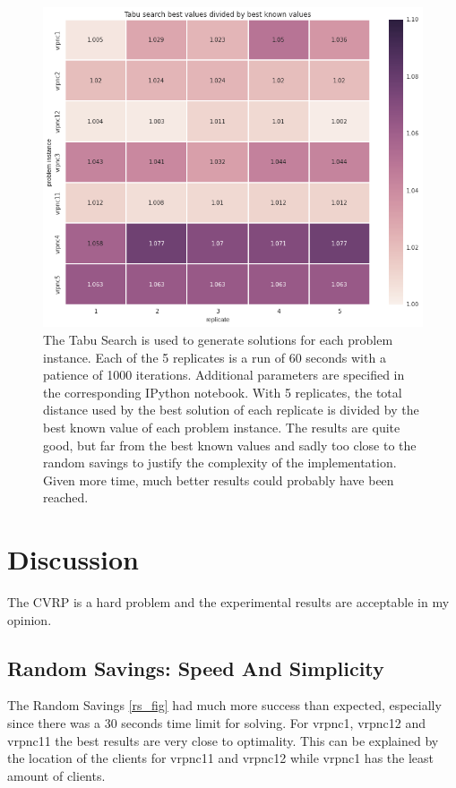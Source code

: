 \documentclass{article} %
\begin{document}
\begin{figure}[!htb]
\begin{center}
 \includegraphics[scale=0.45]{figures/tabu_search}
 \caption{\small  The Tabu Search is used to generate solutions for each problem instance. Each of the 5 replicates is a run of 60 seconds with a patience of 1000 iterations. Additional parameters are specified in the corresponding IPython notebook. With 5 replicates, the total distance used by the best solution of each replicate is divided by the best known value of each problem instance. The results are quite good, but far from the best known values and sadly too close to the random savings to justify the complexity of the implementation. Given more time, much better results could probably have been reached.}
 \label{ts_fig}
 \end{center}
\end{figure}


\newpage
\section{Discussion}
\label{analysis_results}

The CVRP is a hard problem and the experimental results are acceptable in my opinion.\newline

\subsection{Random Savings: Speed And Simplicity}
The Random Savings \ref{rs_fig} had much more success than expected, especially since there was a 30 seconds time limit for solving. For vrpnc1, vrpnc12 and vrpnc11 the best results are very close to optimality. This can be explained by the location of the clients for vrpnc11 and vrpnc12 while vrpnc1 has the least amount of clients.\newline
\end{document}
